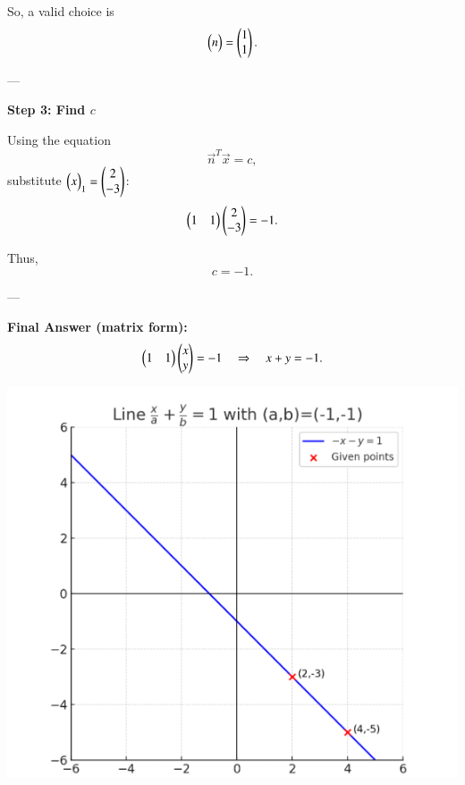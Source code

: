 \documentclass[journal]{IEEEtran}
\begin{document}
So, a valid choice is
\begin{equation}
\begin{pmatrix}n\end{pmatrix} = \begin{pmatrix}1 \\ 1\end{pmatrix}.
\end{equation}

---

\textbf{Step 3: Find $c$}

Using the equation
\begin{equation}
\vec{n}^T \vec{x} = c,
\end{equation}
substitute $\begin{pmatrix}x\end{pmatrix}_1 = \begin{pmatrix}2\\-3\end{pmatrix}$:
\begin{equation}
\begin{pmatrix}1 & 1\end{pmatrix}\begin{pmatrix}2 \\ -3\end{pmatrix} = -1.
\end{equation}

Thus,
\begin{equation}
c = -1.
\end{equation}

---

\textbf{Final Answer (matrix form):}
\begin{equation}
\begin{pmatrix}1 & 1\end{pmatrix}\begin{pmatrix}x \\ y\end{pmatrix} = -1
\quad \Rightarrow \quad x+y=-1.
\end{equation}

\begin{center}
    \includegraphics[width=0.8\columnwidth]{figs/plot6.png}
\end{center}
\end{document}
